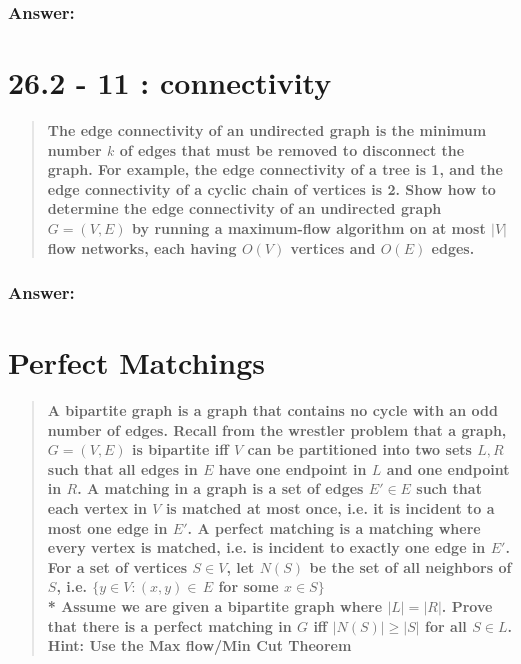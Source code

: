 \documentclass[titlepage]{article}\usepackage[]{graphicx}\usepackage[]{color}
\begin{document}
  \subsubsection{Answer:}
  \vspace{9cm}


\section{26.2 - 11 : connectivity}
  \begin{quote}
    \textbf{The edge connectivity of an undirected graph is the minimum number
      $k$ of edges that must be removed to disconnect the graph. For example,
      the edge connectivity of a tree is 1, and the edge connectivity of a
      cyclic chain of vertices is 2. Show how to determine the edge
      connectivity of an undirected graph $G = (V,E) $ by running a
      maximum-flow algorithm on at most $|V|$ flow networks, each having $O(V)$
      vertices and $O(E)$ edges.}
  \end{quote}

  \subsubsection{Answer:}
  \vspace{9cm}


\section{Perfect Matchings}
  \begin{quote}
      \textbf{A bipartite graph is a graph that contains no cycle with an odd
      number of edges. Recall from the wrestler problem that a graph, $G = (V,
      E)$ is
    bipartite iff $V$ can be partitioned into two sets $L, R$ such that all
    edges in $E$
    have one endpoint in $L$ and one endpoint in $R$. A matching in a graph is a set of
    edges $E' \in E$ such that each vertex in $V$ is matched at most once, i.e. it is
    incident to a most one edge in $E'$. A perfect matching is a matching where every
    vertex is matched, i.e. is incident to exactly one edge in $E'$. For a set of
    vertices $S \in V$, let $N(S)$ be the set of all neighbors of $S$, i.e. $\{y
    \in V : (x,y) \in \, E $ for some $x \in S\}$ \\*
    Assume we are given a bipartite graph where $|L| = |R|$. Prove that there is a
    perfect matching in $G$ iff $|N(S)| \geq |S|$ for all $S \in L$.
    Hint: Use the Max flow/Min Cut Theorem}
  \end{quote}
\end{document}
